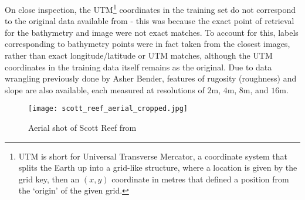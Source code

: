 On close inspection, the UTM\footnote{UTM is short for Universal Transverse Mercator, a coordinate system that splits the Earth up into a grid-like structure, where a location is given by the grid key, then an $(x,y)$ coordinate in metres that defined a position from the `origin' of the given grid.} coordinates in the training set do not correspond to the original data available from \cite{squidle} - this was because the exact point of retrieval for the bathymetry and image were not exact matches. To account for this, labels corresponding to bathymetry points were in fact taken from the closest images, rather than exact longitude/latitude or UTM matches, although the UTM coordinates in the training data itself remains as the original. Due to data wrangling previously done by Asher Bender, features of rugosity (roughness) and slope are also available, each measured at resolutions of $2$m, $4$m, $8$m, and $16$m.

\begin{figure}
    \texttt{[image: scott\_reef\_aerial\_cropped.jpg]}
    \caption{Aerial shot of Scott Reef from \cite{NASA:SRI}}
    \label{fig:scottreefaerial}
\end{figure}







